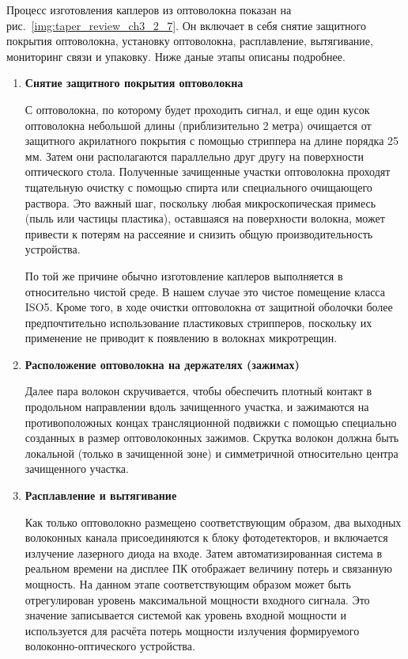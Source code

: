 Процесс изготовления каплеров из оптоволокна показан на рис.~\ref{img:taper_review_ch3_2_7}. Он включает в себя снятие защитного покрытия оптоволокна, установку оптоволокна, расплавление, вытягивание, мониторинг связи и упаковку. Ниже даные этапы описаны подробнее.

\begin{enumerate}

\item{\textbf{Снятие защитного покрытия оптоволокна}}

С оптоволокна, по которому будет проходить сигнал, и еще один кусок оптоволокна небольшой длины (приблизительно 2 метра) очищается от защитного акрилатного покрытия с помощью стриппера на длине порядка 25 мм. Затем они располагаются параллельно друг другу на поверхности оптического стола. Полученные зачищенные участки оптоволокна проходят тщательную очистку с помощью спирта или специального очищающего раствора. Это важный шаг, поскольку любая микроскопическая примесь (пыль или частицы пластика), оставшаяся на поверхности волокна, может привести к потерям на рассеяние и снизить общую производительность устройства.

По той же причине обычно изготовление каплеров выполняется в относительно чистой среде. В нашем случае это чистое помещение класса ISO5. Кроме того, в ходе очистки оптоволокна от защитной оболочки более предпочтительно использование пластиковых стрипперов, поскольку их применение не приводит к появлению в волокнах микротрещин.

\item{\textbf{Расположение оптоволокна на держателях (зажимах)}}

Далее пара волокон скручивается, чтобы обеспечить плотный контакт в продольном направлении вдоль зачищенного участка, и зажимаются на противоположных концах трансляционной подвижки с помощью специально созданных в размер оптоволоконных зажимов. Скрутка волокон должна быть локальной (только в зачищенной зоне) и симметричной относительно центра зачищенного участка.

\item{\textbf{Расплавление и вытягивание}}

Как только оптоволокно размещено соответствующим образом, два выходных волоконных канала присоединяются к блоку фотодетекторов, и включается излучение лазерного диода на входе. Затем автоматизированная система в реальном времени на дисплее ПК отображает величину потерь и связанную мощность. На данном этапе соответствующим образом может быть отрегулирован уровень максимальной мощности входного сигнала. Это значение записывается системой как уровень входной мощности и используется для расчёта потерь мощности излучения формируемого волоконно-оптического устройства.


\end{enumerate}
